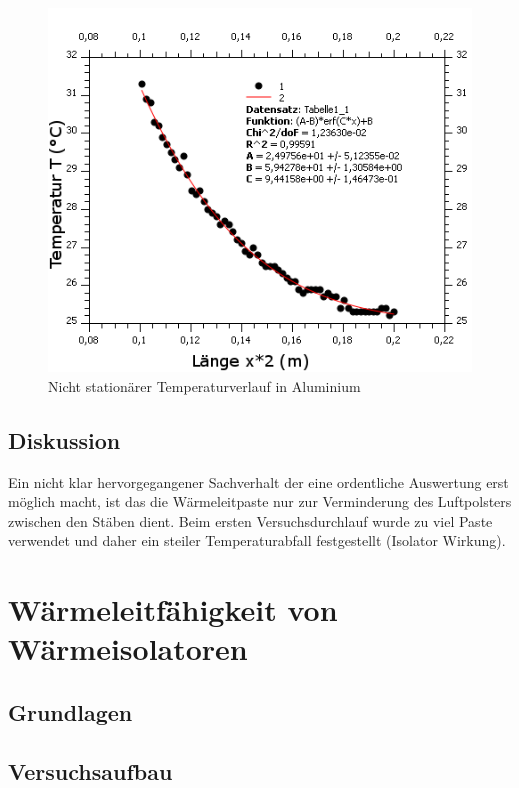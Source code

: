 \documentclass[12pt,a4paper]{article}
\begin{document}
\begin{multicols}{2}
\begin{figure}[H]
	\centering
	\includegraphics[scale=3.7]{./BilderCorrect/nicht_stationaer_temp_verlauf.png}
	\caption{Nicht stationärer Temperaturverlauf in Aluminium }
	\label{fig:stat_verlauf}
\end{figure}

\subsection{Diskussion}
Ein nicht klar hervorgegangener Sachverhalt der eine ordentliche Auswertung erst möglich macht, ist das die Wärmeleitpaste nur zur Verminderung des Luftpolsters zwischen den Stäben dient. Beim ersten Versuchsdurchlauf wurde zu viel Paste verwendet und daher ein steiler Temperaturabfall festgestellt (Isolator Wirkung).\\


\section{Wärmeleitfähigkeit von Wärmeisolatoren}

\subsection{Grundlagen}

\subsection{Versuchsaufbau}


\end{multicols}
\end{document}

